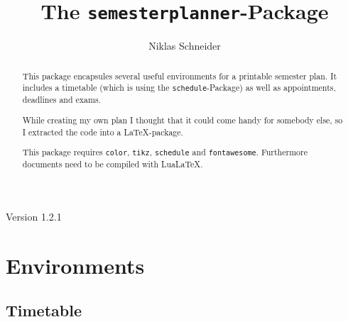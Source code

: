 \documentclass[english]{article}
\title{The \texttt{semesterplanner}-Package}
\author{Niklas Schneider}
\begin{document}
	\maketitle
	\begin{center}
		Version 1.2.1\\
	\end{center}

	\begin{abstract}
		This package encapsules several useful environments for a printable semester plan. It includes a timetable (which is using the \texttt{schedule}-Package) as well as appointments, deadlines and exams.
		
		While creating my own plan I thought that it could come handy for somebody else, so I extracted the code into a \LaTeX-package.
		
		This package requires \texttt{color}, \texttt{tikz}, \texttt{schedule} and \texttt{fontawesome}. Furthermore documents need to be compiled with LuaLaTeX.
	\end{abstract}

	\tableofcontents
	\pagebreak
	
	\section{Environments}
	\subsection{Timetable}
	\label{timetable}
\end{document}
